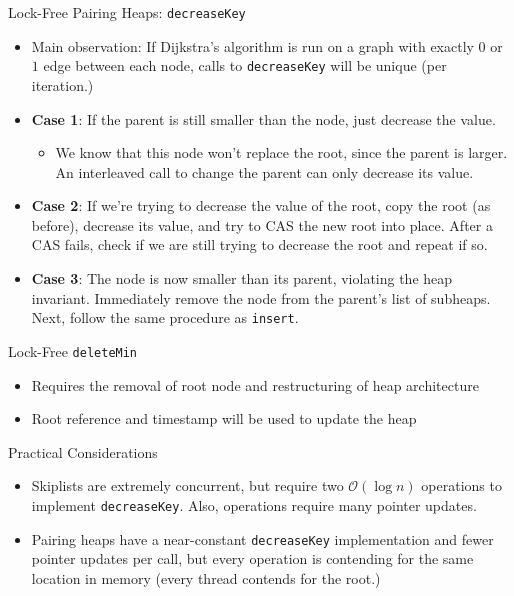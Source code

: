 \documentclass{beamer}
\begin{document}
\begin{frame}{Lock-Free Pairing Heaps: \texttt{decreaseKey}}
  \begin{itemize}
    \item Main observation: If Dijkstra's algorithm is run on a graph with
      exactly $0$ or $1$ edge between each node, calls to \texttt{decreaseKey}
      will be unique (per iteration.)
    \item \textbf{Case 1}: If the parent is still smaller than the node, just decrease the value.
      \begin{itemize}
        \item We know that this node won't replace the root, since the parent is larger.
          An interleaved call to change the parent can only decrease its value.
      \end{itemize}
    \item \textbf{Case 2}: If we're trying to decrease the value of the root, copy the root (as before),
      decrease its value, and try to CAS the new root into place. After a CAS fails, check if
      we are still trying to decrease the root and repeat if so.
    \item \textbf{Case 3}: The node is now smaller than its parent, violating the heap invariant. Immediately remove
      the node from the parent's list of subheaps. Next, follow the same procedure as \texttt{insert}.
  \end{itemize}
\end{frame}

\begin{frame}{Lock-Free \texttt{deleteMin}}
    \begin{itemize}
    	\item Requires the removal of root node and restructuring of heap architecture
    	\item Root reference and timestamp will be used to update the heap
    \end{itemize}
\end{frame}


\begin{frame}{Practical Considerations}
  \begin{itemize}
    \item Skiplists are extremely concurrent, but require
      two $\mathcal{O}(\log n)$ operations to implement \texttt{decreaseKey}. Also,
      operations require many pointer updates.
    \item Pairing heaps have a near-constant \texttt{decreaseKey} implementation and fewer
      pointer updates per call, but
      every operation is contending for the same location in memory (every thread contends for the root.)
  \end{itemize}
\end{frame}
\end{document}
